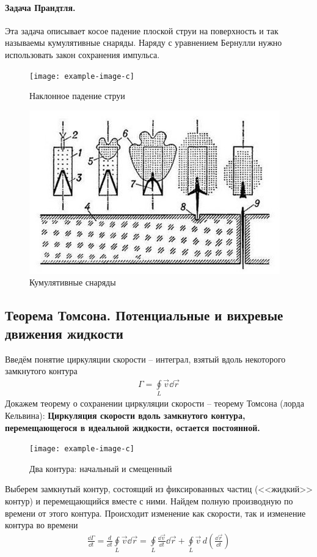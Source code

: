 \paragraph{Задача Прандтля.} Эта задача описывает косое падение плоской струи на поверхность и так называемы кумулятивные снаряды. Наряду с уравнением Бернулли нужно использовать закон сохранения импульса.
\begin{figure}[H]
	\centering
	\texttt{[image: example-image-c]}
	\caption{Наклонное падение струи}
	\label{fig:figure11}
\end{figure}
\begin{figure}[H]
	\centering
	\includegraphics[scale=1]{photo/kommu.jpg}
	\caption{Кумулятивные снаряды}
	\label{fig:figure12}
\end{figure}



\subsection{Теорема Томсона. Потенциальные и вихревые движения жидкости}

Введём понятие циркуляции скорости -- интеграл, взятый вдоль некоторого замкнутого контура
\begin{align*}
\Gamma = \oint \limits_ { L } \vec{v} \dd{\vec{r}}
\end{align*}
Докажем теорему о сохранении циркуляции скорости -- теорему Томсона (лорда Кельвина):
\textbf{Циркуляция скорости вдоль замкнутого контура, перемещающегося в идеальной жидкости, остается постоянной.}
\begin{figure}[h]
	\centering
	\texttt{[image: example-image-c]}
	\caption{Два контура: начальный и смещенный}
	\label{fig:figure13}
\end{figure}
Выберем замкнутый контур, состоящий из фиксированных частиц (<<жидкий>> контур) и перемещающийся вместе с ними.  Найдем полную производную по времени от этого контура. Происходит изменение как скорости, так и изменение контура во времени
\begin{align*}
\frac{\dd \Gamma}{\dd t}=\frac{d}{\dd t} \oint\limits_{L} \vec{v} \dd \vec{r}=\oint\limits_{L} \frac{\dd \vec{v}}{\dd t} \dd \vec{r}+\oint\limits_L \vec{v}\, d\left(\frac{\dd \vec{r}}{\dd t}\right)
\end{align*}

